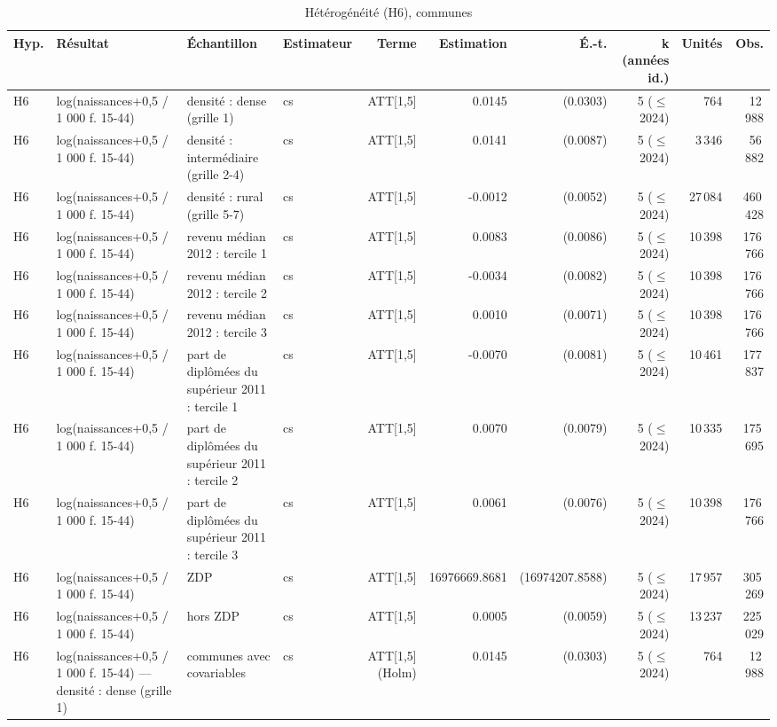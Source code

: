 \begin{table}\centering
\begin{threeparttable}
\caption{Hétérogénéité (H6), communes}\label{tab:h6}
\scriptsize
\begin{tabular}{lp{6.0cm}p{4.4cm}lrrrrrr}
\toprule
Hyp. & Résultat & Échantillon & Estimateur & Terme & Estimation & É.-t. & k (années id.) & Unités & Obs. \\
\midrule
H6 & log(naissances+0,5 / 1 000 f. 15-44) & densité : dense (grille 1) & cs & ATT[1,5] & 0.0145 & (0.0303) & 5 ($\leq$ 2024) & 764 & 12\,988 \\
H6 & log(naissances+0,5 / 1 000 f. 15-44) & densité : intermédiaire (grille 2-4) & cs & ATT[1,5] & 0.0141 & (0.0087) & 5 ($\leq$ 2024) & 3\,346 & 56\,882 \\
H6 & log(naissances+0,5 / 1 000 f. 15-44) & densité : rural (grille 5-7) & cs & ATT[1,5] & -0.0012 & (0.0052) & 5 ($\leq$ 2024) & 27\,084 & 460\,428 \\
H6 & log(naissances+0,5 / 1 000 f. 15-44) & revenu médian 2012 : tercile 1 & cs & ATT[1,5] & 0.0083 & (0.0086) & 5 ($\leq$ 2024) & 10\,398 & 176\,766 \\
H6 & log(naissances+0,5 / 1 000 f. 15-44) & revenu médian 2012 : tercile 2 & cs & ATT[1,5] & -0.0034 & (0.0082) & 5 ($\leq$ 2024) & 10\,398 & 176\,766 \\
H6 & log(naissances+0,5 / 1 000 f. 15-44) & revenu médian 2012 : tercile 3 & cs & ATT[1,5] & 0.0010 & (0.0071) & 5 ($\leq$ 2024) & 10\,398 & 176\,766 \\
H6 & log(naissances+0,5 / 1 000 f. 15-44) & part de diplômées du supérieur 2011 : tercile 1 & cs & ATT[1,5] & -0.0070 & (0.0081) & 5 ($\leq$ 2024) & 10\,461 & 177\,837 \\
H6 & log(naissances+0,5 / 1 000 f. 15-44) & part de diplômées du supérieur 2011 : tercile 2 & cs & ATT[1,5] & 0.0070 & (0.0079) & 5 ($\leq$ 2024) & 10\,335 & 175\,695 \\
H6 & log(naissances+0,5 / 1 000 f. 15-44) & part de diplômées du supérieur 2011 : tercile 3 & cs & ATT[1,5] & 0.0061 & (0.0076) & 5 ($\leq$ 2024) & 10\,398 & 176\,766 \\
H6 & log(naissances+0,5 / 1 000 f. 15-44) & ZDP & cs & ATT[1,5] & 16976669.8681 & (16974207.8588) & 5 ($\leq$ 2024) & 17\,957 & 305\,269 \\
H6 & log(naissances+0,5 / 1 000 f. 15-44) & hors ZDP & cs & ATT[1,5] & 0.0005 & (0.0059) & 5 ($\leq$ 2024) & 13\,237 & 225\,029 \\
H6 & log(naissances+0,5 / 1 000 f. 15-44) — densité : dense (grille 1) & communes avec covariables & cs & ATT[1,5] (Holm) & 0.0145 & (0.0303) & 5 ($\leq$ 2024) & 764 & 12\,988 \\

\end{tabular}
\end{threeparttable}
\end{table}
